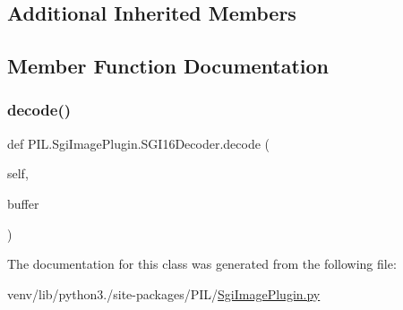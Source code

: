 \subsection*{Additional Inherited Members}


\subsection{Member Function Documentation}
\mbox{\label{classPIL_1_1SgiImagePlugin_1_1SGI16Decoder_abf1cf1d9f0827045c49f0b2604d353fe}} 
\subsubsection{\texorpdfstring{decode()}{decode()}}
{\footnotesize\ttfamily def P\+I\+L.\+Sgi\+Image\+Plugin.\+S\+G\+I16\+Decoder.\+decode (\begin{DoxyParamCaption}\item[{}]{self,  }\item[{}]{buffer }\end{DoxyParamCaption})}



The documentation for this class was generated from the following file\+:\begin{DoxyCompactItemize}
\item 
venv/lib/python3./site-\/packages/\+P\+I\+L/\hyperlink{SgiImagePlugin_8py}{Sgi\+Image\+Plugin.\+py}\end{DoxyCompactItemize}

